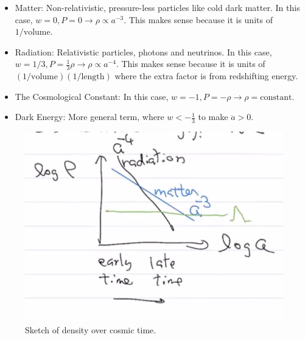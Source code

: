 \documentclass{article}
\begin{document}
\begin{itemize}
    \item Matter: Non-relativistic, pressure-less particles like cold dark matter. In this case, $w = 0, P = 0 \rightarrow \boxed{\rho \propto a^{-3}}$. This makes sense because it is units of $1/\text{volume}$.
    \item Radiation: Relativistic particles, photons and neutrinos. In this case, $w = 1/3, P = \frac13 \rho \rightarrow \boxed{\rho \propto a^{-4}}$. This makes sense because it is units of $\left(1/\text{volume}\right)\left(1/\text{length}\right) $ where the extra factor is from redshifting energy.
    \item The Cosmological Constant: In this case, $w = -1, P=-\rho \rightarrow \rho = \text{constant}$.
    \item Dark Energy: More general term, where $w < -\frac13$ to make $\ddot{a} >0$.
\end{itemize}

\begin{figure}
    \centering
    \includegraphics{density.png}
    \caption{Sketch of density over cosmic time. }
    \label{fig:density}
\end{figure}
\end{document}

